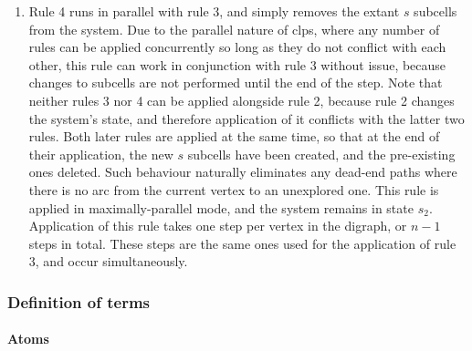 \begin{enumerate}
    \item Rule 4 runs in parallel with rule 3, and simply removes the extant \(s\) subcells from the system.  Due to the parallel nature of \gls{clps}, where any number of rules can be applied concurrently so long as they do not conflict with each other, this rule can work in conjunction with rule 3 without issue, because changes to subcells are not performed until the end of the step.  Note that neither rules 3 nor 4 can be applied alongside rule 2, because rule 2 changes the system's state, and therefore application of it conflicts with the latter two rules.  Both later rules are applied at the same time, so that at the end of their application, the new \(s\) subcells have been created, and the pre-existing ones deleted.  Such behaviour naturally eliminates any dead-end paths where there is no arc from the current vertex to an unexplored one.  This rule is applied in maximally-parallel mode, and the system remains in state \(s_2\).  Application of this rule takes one step per vertex in the digraph, or \(n - 1\) steps in total.  These steps are the same ones used for the application of rule 3, and occur simultaneously.
\end{enumerate}

\subsubsection{\label{sec:tsp:hppterms}Definition of terms}

\paragraph{Atoms}
\begin{description}
\end{description}

